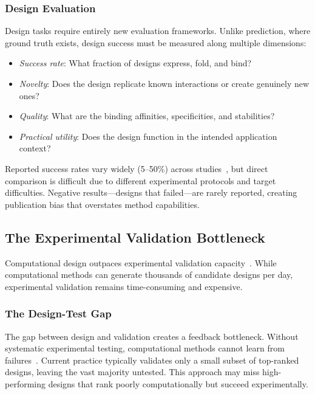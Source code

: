 \subsubsection{Design Evaluation}

Design tasks require entirely new evaluation frameworks. Unlike prediction, where ground truth exists, design success must be measured along multiple dimensions:

\begin{itemize}
    \item \textit{Success rate}: What fraction of designs express, fold, and bind?
    \item \textit{Novelty}: Does the design replicate known interactions or create genuinely new ones?
    \item \textit{Quality}: What are the binding affinities, specificities, and stabilities?
    \item \textit{Practical utility}: Does the design function in the intended application context?
\end{itemize}

Reported success rates vary widely (5--50\%) across studies~\cite{watson2023rfdiffusion,zambaldi2024alphaproteo}, but direct comparison is difficult due to different experimental protocols and target difficulties. Negative results---designs that failed---are rarely reported, creating publication bias that overstates method capabilities.

\subsection{The Experimental Validation Bottleneck}
\label{subsec:validation}

Computational design outpaces experimental validation capacity~\cite{watson2023rfdiffusion}. While computational methods can generate thousands of candidate designs per day, experimental validation remains time-consuming and expensive.

\subsubsection{The Design-Test Gap}

The gap between design and validation creates a feedback bottleneck. Without systematic experimental testing, computational methods cannot learn from failures~\cite{trepte2024ai}. Current practice typically validates only a small subset of top-ranked designs, leaving the vast majority untested. This approach may miss high-performing designs that rank poorly computationally but succeed experimentally.

